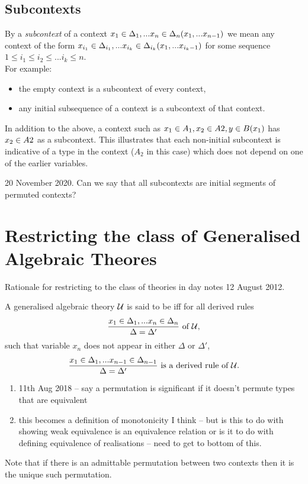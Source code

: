 \documentclass[10pt,a4paper]{scrartcl}
\begin{document}
\subsection{Subcontexts}
By a \textit{subcontext} of a context $x_1 \in \Delta_1,... x_{n} \in \Delta_{n}(x_1,...x_{n-1})$ we mean any context
of the form
$x_{i_1} \in {\Delta}_{i_1},... x_{i_k} \in {\Delta}_{i_k}(x_1,...x_{i_k-1})$ for some sequence 
$1 \leq i_1 \leq i_2 \leq ... i_k \leq n$. \\

\noindent
For example:
\begin {itemize}
\item the empty context  is a subcontext of every 
context,
\item any initial subsequence of a context is a subcontext of that context.
\end{itemize}

\noindent
In addition to the above, a context such as $x_1 \in A_1,x_2 \in A2,y \in B(x_1)$ has 
$x_2 \in A2$ as a subcontext. This illustrates that each non-initial subcontext is indicative of a type in the context ($A_2$ in this case)
which does not depend on one of the earlier variables.

\begin{note}
20 November 2020.
Can we say that all subcontexts are initial segments of permuted contexts?
\end{note}


\section{Restricting the class of Generalised Algebraic Theores}

Rationale for restricting to the class of theories in day notes 12 August 2012. 
\begin{definition}
A generalised algebraic theory $\mathcal{U}$ is said to be 
iff for all derived rules 
$$
\frac{x_1 \in \Delta_1,... x_{n} \in \Delta_{n}}{\Delta=\Delta'} \mbox{ of $\mathcal{U}$,}
$$
such that variable $x_n$  does not appear in either
$\Delta$ or $\Delta'$,
$$
\frac{x_1 \in \Delta_1,... x_{n-1} \in \Delta_{n-1}}{\Delta=\Delta'} \mbox{ is a derived rule of $\mathcal{U}$.}
$$
\end{definition}

\begin{framed}
\begin{enumerate}
\item 11th Aug 2018 -- say a permutation is significant if it doesn't permute types that are equivalent
\item this becomes a definition of monotonicity I think -- but is this to do with showing weak equivalence 
is an equivalence relation or is it to do with defining equivalence of realisations -- need to get to bottom of this.
\end{enumerate}
\end{framed}
\noindent
Note that if there is an admittable  permutation between two contexts then it is the unique such permutation. 
\end{document}
